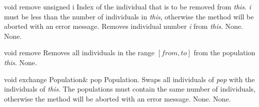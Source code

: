 \vspace*{4ex}

\setNormalInstance
\printMethodWithOneParam
{void}
{remove}
{unsigned}
{i}
{Index of the individual that is to be removed from {\em this}.
 {\em i} must be less than the number of individuals in {\em this},
 otherwise the method will be aborted with an error message.}
{Removes individual number {\em i} from {\em this}.}
{None.}
{None.}

\vspace*{4ex}

\setNormalInstance
\setCorrectWidthThree{8pt}
\printMethodWithParamsSaved
{void}
{}
{remove}
{Removes all individuals in the range $[from, to]$ from the
 population {\em this}.}
{None.}
\setCorrectWidthThree{4pt}

\clearpage

\setNormalInstance
\printMethodWithOneParam
{void}
{exchange}
{Population\&}
{pop}
{Population.}
{Swaps all individuals of {\em pop} with the individuals of {\em this}.
 The populations must contain the same number of individuals, otherwise
 the method will be aborted with an error message.}
{None.}
{None.}



